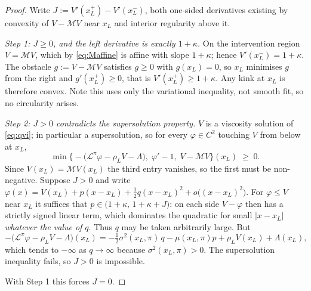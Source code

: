 \documentclass[11pt]{article}
\theoremstyle{remark}
\begin{document}
\begin{proof}
Write $J := V'(x_L^+)-V'(x_L^-)$, both one-sided derivatives existing by
convexity of $V-\mathcal{M}V$ near $x_L$ and interior regularity above it.

\emph{Step 1: $J \ge 0$, and the left derivative is exactly $1+\kappa$.}
On the intervention region $V=\mathcal{M}V$, which by \eqref{eq:Maffine} is
affine with slope $1+\kappa$; hence $V'(x_L^-)=1+\kappa$. The obstacle
$g:=V-\mathcal{M}V$ satisfies $g\ge0$ with $g(x_L)=0$, so $x_L$ minimises
$g$ from the right and $g'(x_L^+)\ge0$, that is $V'(x_L^+)\ge1+\kappa$.
Any kink at $x_L$ is therefore convex. Note this uses only the variational
inequality, not smooth fit, so no circularity arises.

\emph{Step 2: $J>0$ contradicts the supersolution property.}
$V$ is a viscosity solution of \eqref{eq:qvi}; in particular a
supersolution, so for every $\varphi\in C^2$ touching $V$ from below at
$x_L$,
\[
\min\Big\{-\big(\mathcal{L}^\pi\varphi-\rho_LV-\Lambda\big),\;
\varphi'-1,\; V-\mathcal{M}V\Big\}(x_L) \;\ge\; 0 .
\]
Since $V(x_L)=\mathcal{M}V(x_L)$ the third entry vanishes, so the first
must be non-negative. Suppose $J>0$ and write
$\varphi(x)=V(x_L)+p(x-x_L)+\tfrac12 q(x-x_L)^2+o\big((x-x_L)^2\big)$.
For $\varphi\le V$ near $x_L$ it suffices that
$p\in\big(1+\kappa,\,1+\kappa+J\big)$: on each side $V-\varphi$ then has a
strictly signed linear term, which dominates the quadratic for small
$|x-x_L|$ \emph{whatever the value of $q$}. Thus $q$ may be taken
arbitrarily large. But
\[
-\big(\mathcal{L}^\pi\varphi-\rho_LV-\Lambda\big)(x_L)
= -\tfrac12\sigma^2(x_L,\pi)\,q - \mu(x_L,\pi)p + \rho_LV(x_L)+\Lambda(x_L),
\]
which tends to $-\infty$ as $q\to\infty$ because $\sigma^2(x_L,\pi)>0$.
The supersolution inequality fails, so $J>0$ is impossible.

With Step 1 this forces $J=0$.
\end{proof}
\end{document}
